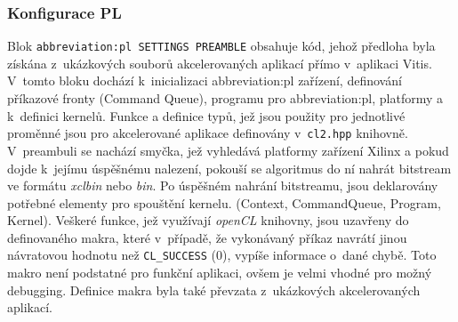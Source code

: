 \documentclass[a4paper, twoside, 11pt]{article}
\begin{document}
		\subsubsection{Konfigurace PL}
		Blok \texttt{\gls{abbreviation:pl} SETTINGS PREAMBLE} obsahuje kód, jehož předloha byla získána z~ukázkových souborů akcelerovaných aplikací přímo v~aplikaci Vitis. V~tomto bloku dochází k~inicializaci \gls{abbreviation:pl} zařízení, definování příkazové fronty (Command Queue), programu pro \gls{abbreviation:pl}, platformy a k~definici kernelů. Funkce a definice typů, jež jsou použity pro jednotlivé proměnné jsou pro akcelerované aplikace definovány v~\texttt{cl2.hpp} knihovně. V~preambuli se nachází smyčka, jež vyhledává platformy zařízení Xilinx a pokud dojde k~jejímu úspěšnému nalezení, pokouší se algoritmus do ní nahrát bitstream ve formátu \textit{xclbin} nebo \textit{bin}. Po úspěšném nahrání bitstreamu, jsou deklarovány potřebné elementy pro spouštění kernelu. (Context, CommandQueue, Program, Kernel). Veškeré funkce, jež využívají \textit{openCL} knihovny, jsou uzavřeny do definovaného makra, které v~případě, že vykonávaný příkaz navrátí jinou návratovou hodnotu než \texttt{CL\_SUCCESS} (0), vypíše informace o~dané chybě. Toto makro není podstatné pro funkční aplikaci, ovšem je velmi vhodné pro možný debugging. Definice makra byla také převzata z~ukázkových akcelerovaných aplikací.
\end{document}
